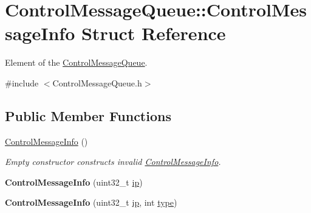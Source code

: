 \hypertarget{structControlMessageQueue_1_1ControlMessageInfo}{}\section{Control\+Message\+Queue\+:\+:Control\+Message\+Info Struct Reference}
\label{structControlMessageQueue_1_1ControlMessageInfo}


Element of the \mbox{\hyperlink{classControlMessageQueue}{Control\+Message\+Queue}}.  




{\ttfamily \#include $<$Control\+Message\+Queue.\+h$>$}

\subsection*{Public Member Functions}
\begin{DoxyCompactItemize}
\item 
\mbox{\label{structControlMessageQueue_1_1ControlMessageInfo_a2e85f6e0583ea739ff6ec35ef1655bef}} 
\mbox{\hyperlink{structControlMessageQueue_1_1ControlMessageInfo_a2e85f6e0583ea739ff6ec35ef1655bef}{Control\+Message\+Info}} ()
\begin{DoxyCompactList}\small\item\em Empty constructor constructs invalid \mbox{\hyperlink{structControlMessageQueue_1_1ControlMessageInfo}{Control\+Message\+Info}}. \end{DoxyCompactList}\item 
\mbox{\label{structControlMessageQueue_1_1ControlMessageInfo_a343b872010632c73cd5d811f0439db65}} 
{\bfseries Control\+Message\+Info} (uint32\+\_\+t \mbox{\hyperlink{structControlMessageQueue_1_1ControlMessageInfo_a9c729d9dd8e2bbabfbdfcdaf845065f6}{ip}})
\item 
\mbox{\label{structControlMessageQueue_1_1ControlMessageInfo_ab3d25b3f23c684a35f85ecad82c4b0de}} 
{\bfseries Control\+Message\+Info} (uint32\+\_\+t \mbox{\hyperlink{structControlMessageQueue_1_1ControlMessageInfo_a9c729d9dd8e2bbabfbdfcdaf845065f6}{ip}}, int \mbox{\hyperlink{structControlMessageQueue_1_1ControlMessageInfo_a0166019e4c749c1fcea08074c641af3e}{type}})
\end{DoxyCompactItemize}
